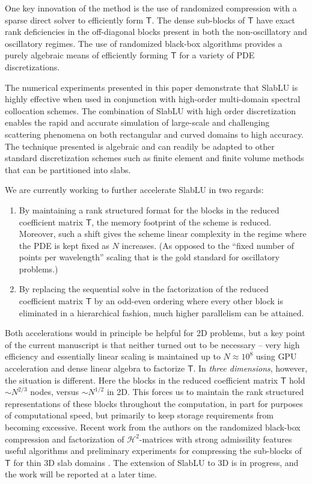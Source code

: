 \documentclass[11pt]{amsart}
\newcommand{\mtx}[1]{\bm{\mathsf{#1}}}
\begin{document}
One key innovation of the method is the use of randomized compression with a sparse direct solver to efficiently form $\mtx T$. 
The dense sub-blocks of $\mtx T$ have exact rank deficiencies in the off-diagonal blocks present in both the non-oscillatory and oscillatory regimes. 
The use of randomized black-box algorithms provides a purely algebraic means of efficiently forming $\mtx T$ for a variety of PDE discretizations. 

The numerical experiments presented in this paper demonstrate that SlabLU is highly effective when used in conjunction with high-order multi-domain spectral collocation schemes. 
The combination of SlabLU with high order discretization enables the rapid and accurate simulation of large-scale and challenging scattering phenomena on both rectangular and curved domains to high accuracy. The technique presented is algebraic and can readily be adapted to other standard discretization schemes such as finite element and finite volume methods
that can be partitioned into slabs.

We are currently working to further accelerate SlabLU in two regards: 
\begin{enumerate}
\item By maintaining a rank structured format for the blocks in the reduced coefficient matrix $\mtx{T}$, the memory footprint of the scheme is reduced. Moreover, such a shift gives the scheme linear complexity in the regime where the PDE is kept fixed as $N$ increases. (As opposed to the ``fixed number of points per wavelength'' scaling that is the gold standard for oscillatory problems.)
\item By replacing the sequential solve in the factorization of the reduced coefficient matrix $\mtx{T}$ by an odd-even ordering where every other block is eliminated in a hierarchical fashion, much higher parallelism can be attained.
\end{enumerate}
Both accelerations would in principle be helpful for 2D problems, but a key point of the current manuscript is that neither turned out to be necessary -- very high efficiency and essentially linear scaling is maintained up to $N \approx 10^8$ using GPU acceleration and dense 
linear algebra to factorize $\mtx T$.
In \textit{three dimensions}, however, the situation is different. Here the blocks in the reduced coefficient matrix $\mtx{T}$ hold $\sim N^{2/3}$ nodes, versus $\sim N^{1/2}$ in 2D. 
This forces us to maintain the rank structured representations of these blocks throughout the computation, in part for purposes of computational speed, but primarily to keep storage requirements from becoming excessive. 
Recent work from the authors on the randomized black-box compression and factorization 
of $\mathcal H^2$-matrices with strong admissility features useful algorithms and preliminary
experiments for compressing the sub-blocks of $\mtx T$ for thin 3D slab domains \cite{yesypenko2023randomized}. 
The extension of SlabLU to 3D is in progress, and the work will be reported at a later time.
\end{document}
